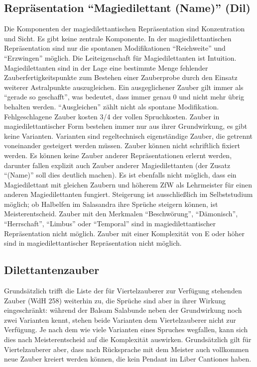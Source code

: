\subsection{Repräsentation \enquote{Magiedilettant (Name)} (Dil)}
Die Komponenten der magiedilettantischen Repräsentation sind Konzentration und Sicht. Es gibt keine zentrale Komponente. In der magiedilettantischen Repräsentation sind nur die spontanen Modifikationen \enquote{Reichweite} und \enquote{Erzwingen} möglich. Die Leiteigenschaft für Magiedilettanten ist Intuition. Magiedilettanten sind in der Lage eine bestimmte Menge fehlender Zauberfertigkeitspunkte zum Bestehen einer Zauberprobe durch den Einsatz weiterer Astralpunkte auszugleichen. Ein ausgeglichener Zauber gilt immer als \enquote{gerade so geschafft}, was bedeutet, dass immer genau \SI{0}{\ZfPstern} und nicht mehr übrig behalten werden. \enquote{Ausgleichen} zählt nicht als spontane Modifikation. Fehlgeschlagene Zauber kosten 3/4 der vollen Spruchkosten. Zauber in magiedilettantischer Form bestehen immer nur aus ihrer Grundwirkung, es gibt keine Varianten. Varianten sind regeltechnisch eigenständige Zauber, die getrennt voneinander gesteigert werden müssen. Zauber können nicht schriftlich fixiert werden. Es können keine Zauber anderer Repräsentationen erlernt werden, darunter fallen explizit auch Zauber anderer Magiedilettanten (der Zusatz \enquote{(Name)} soll dies deutlich machen). Es ist ebenfalls nicht möglich, dass ein Magiedilettant mit gleichen Zaubern und höherem ZfW als Lehrmeister für einen anderen Magiedilettanten fungiert. Steigerung ist ausschließlich im Selbststudium möglich; ob Halbelfen im Salasandra ihre Sprüche steigern können, ist Meisterentscheid. Zauber mit den Merkmalen \enquote{Beschwörung}, \enquote{Dämonisch}, \enquote{Herrschaft}, \enquote{Limbus} oder \enquote{Temporal} sind in magiedilettantischer Repräsentation nicht möglich. Zauber mit einer Komplexität von E oder höher sind in magiedilettantischer Repräsentation nicht möglich.

\subsection{Dilettantenzauber}
Grundsätzlich trifft die Liste der für Viertelzauberer zur Verfügung stehenden Zauber (WdH 258) weiterhin zu, die Sprüche sind aber in ihrer Wirkung eingeschränkt: während der Balsam Salabunde neben der Grundwirkung noch zwei Varianten kennt, stehen beide Varianten dem Viertelzauberer nicht zur Verfügung. Je nach dem wie viele Varianten eines Spruches wegfallen, kann sich dies nach Meisterentscheid auf die Komplexität auswirken. Grundsätzlich gilt für Viertelzauberer aber, dass nach Rücksprache mit dem Meister auch vollkommen neue Zauber kreiert werden können, die kein Pendant im Liber Cantiones haben.

